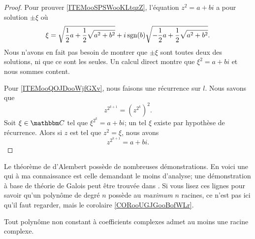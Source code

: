 \begin{proof}
    Pour prouver \ref{ITEMooSPSWooKLtqzZ}, l'équation \( z^2=a+bi\) a pour solution \( \pm\xi\) où
        \begin{equation}
            \xi=\sqrt{ \frac{ 1 }{2}a+\frac{ 1 }{2}\sqrt{ a^2+b^2 } }+i\operatorname{sgn}(b)\sqrt{ -\frac{ 1 }{2}a+\frac{ 1 }{2}\sqrt{ a^2+b^2 } }.
        \end{equation}
        Nous n'avons en fait pas besoin de montrer que \( \pm\xi\) sont toutes deux des solutions, ni que ce sont les seules. Un calcul direct montre que \( \xi^2=a+bi\) et nous sommes content.

    Pour \ref{ITEMooQOJDooWjfGXv}, nous faisons une récurrence sur \( l\). Nous savons que
        \begin{equation}
            z^{2^{k+1}}=(z^{2^k})^2.
        \end{equation}
        Soit \( \xi\in \eC\) tel que \( \xi^{2^k}=a+bi\); un tel \( \xi\) existe par hypothèse de récurrence. Alors si \( z\) est tel que \( z^2=\xi\), nous avons 
        \begin{equation}
            z^{2^{k+1}}=a+bi.
        \end{equation}
\end{proof}

Le théorème de d'Alembert possède de nombreuses démonstrations. En voici une qui à ma connaissance est celle demandant le moins d'analyse; une démonstration à base de théorie de Galois peut être trouvée dans \cite{rqrNyg,ooPSLMooAVODjn}. Si vous lisez ces lignes pour savoir qu'un polynôme de degré \( n\) possède au \emph{maximum} \( n\) racines, ce n'est pas ici qu'il faut regarder, mais le corolaire \ref{CORooUGJGooBofWLr}.
\begin{theorem}   \label{THOooIRJYooBiHRyW}
    Tout polynôme non constant à coefficients complexes admet au moins une racine complexe.
\end{theorem}

